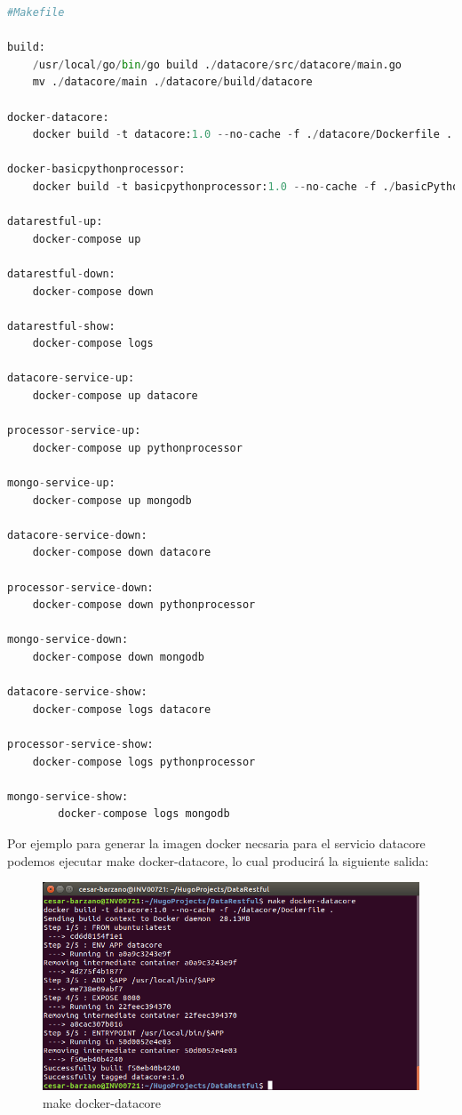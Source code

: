 \documentclass[a4paper,11pt]{book}
\begin{document}
\begin{lstlisting}[language=python,caption={Makefile}]
#Makefile

build:
	/usr/local/go/bin/go build ./datacore/src/datacore/main.go
	mv ./datacore/main ./datacore/build/datacore

docker-datacore:
	docker build -t datacore:1.0 --no-cache -f ./datacore/Dockerfile .

docker-basicpythonprocessor:
	docker build -t basicpythonprocessor:1.0 --no-cache -f ./basicPythonProcessor/Dockerfile .

datarestful-up:
	docker-compose up

datarestful-down:
	docker-compose down

datarestful-show:
	docker-compose logs

datacore-service-up:
	docker-compose up datacore

processor-service-up:
	docker-compose up pythonprocessor

mongo-service-up:
	docker-compose up mongodb

datacore-service-down:
	docker-compose down datacore

processor-service-down:
	docker-compose down pythonprocessor

mongo-service-down:
	docker-compose down mongodb

datacore-service-show:
	docker-compose logs datacore

processor-service-show:
	docker-compose logs pythonprocessor

mongo-service-show:
		docker-compose logs mongodb
\end{lstlisting}

Por ejemplo para generar la imagen docker necsaria para el servicio datacore podemos ejecutar make docker-datacore, lo cual producirá la siguiente salida:

\begin{figure}[H]  
\centering 
\includegraphics[scale=0.35]{imagenes/make_docker_datacore.png}
\caption{ make docker-datacore }  
\end{figure} 
\end{document}
